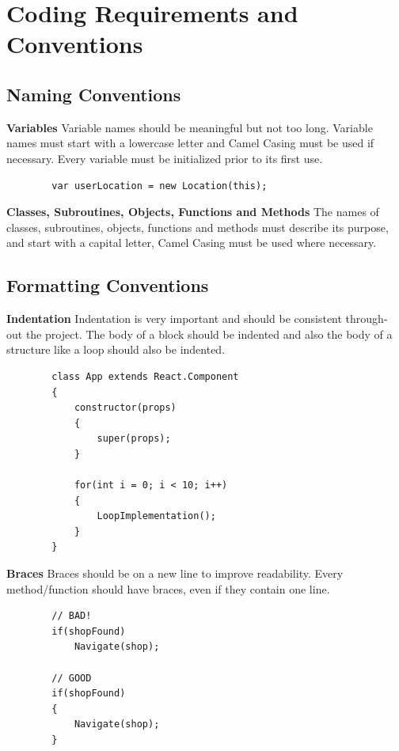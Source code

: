 \documentclass{article}
\begin{document}
\pagebreak


\section{Coding Requirements and Conventions}
\subsection{Naming Conventions}
    \indent \textbf{Variables}
     Variable names should be meaningful but not too long. Variable 
     \indent names must start with a lowercase letter and Camel Casing must be used if  \indent necessary. Every variable must be initialized prior to its first use.
     \begin{lstlisting}
        var userLocation = new Location(this);
    \end{lstlisting}
    \newline \newline
    \indent  \indent \textbf{Classes, Subroutines, Objects, Functions and Methods}
    The names \indent of classes, subroutines, objects, functions and methods must describe its \indent purpose, and start with a capital letter, Camel Casing must be used where \indent necessary. 
    
\subsection{Formatting Conventions}
    \indent \textbf{Indentation}
    Indentation is very important and should be consistent through-  \indent out the project. The body of a block should be indented and also the body \indent of a structure like a loop should also be indented. \newline
    \begin{lstlisting}
        class App extends React.Component
        {
            constructor(props)
            {
                super(props);
            }
            
            for(int i = 0; i < 10; i++)
            {
                LoopImplementation();
            }
        }
    \end{lstlisting}
    \newline 
    \indent \textbf{Braces}
    Braces should be on a new line to improve readability. Every method/function should have braces, even if they contain one line.
    \begin{lstlisting}
        // BAD!
        if(shopFound)
            Navigate(shop);
        
        // GOOD  
        if(shopFound)
        {
            Navigate(shop);
        }
    \end{lstlisting}
    
\end{document}
